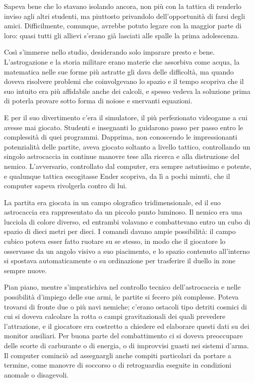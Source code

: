 {Sapeva bene che lo stavano isolando ancora, non più con la tattica di
	renderlo inviso agli altri studenti, ma piuttosto privandolo
	dell'opportunità di farsi degli amici. Difficilmente, comunque, avrebbe
	potuto legare con la maggior parte di loro: quasi tutti gli allievi
	s'erano già lasciati alle spalle la prima adolescenza.}

{Così s'immerse nello studio, desiderando solo imparare presto e bene.
	L'astrogazione e la storia militare erano materie che assorbiva come
	acqua, la matematica nelle sue forme più astratte gli dava delle
	difficoltà, ma quando doveva risolvere problemi che coinvolgevano lo
	spazio e il tempo scopriva che il suo intuito era più affidabile anche
	dei calcoli, e spesso vedeva la soluzione prima di poterla provare sotto
	forma di noiose e snervanti equazioni.}

{E per il suo divertimento c'era il simulatore, il più perfezionato
	videogame a cui avesse mai giocato. Studenti e insegnanti lo guidarono
	passo per passo entro le complessità di quei programmi. Dapprima, non
	conoscendo le impressionanti potenzialità delle partite, aveva giocato
	soltanto a livello tattico, controllando un singolo astrocaccia in
	continue manovre tese alla ricerca e alla distruzione del nemico.
	L'avversario, controllato dal computer, era sempre astutissimo e
	potente, e qualunque tattica escogitasse Ender scopriva, da lì a pochi
	minuti, che il computer sapeva rivolgerla contro di lui.}

{La partita era giocata in un campo olografico tridimensionale, ed il
	suo astrocaccia era rappresentato da un piccolo punto luminoso. Il
	nemico era una lucciola di colore diverso, ed entrambi volavano e
	combattevano entro un cubo di spazio di dieci metri per dieci. I comandi
	davano ampie possibilità: il campo cubico poteva esser fatto ruotare su
	se stesso, in modo che il giocatore lo osservasse da un angolo visivo a
	suo piacimento, e lo spazio contenuto all'interno si spostava
	automaticamente o su ordinazione per trasferire il duello in zone sempre
	nuove.}

{Pian piano, mentre s'impratichiva nel controllo tecnico
	dell'astrocaccia e nelle possibilità d'impiego delle sue armi, le
	partite si fecero più complesse. Poteva trovarsi di fronte due o più
	navi nemiche; c'erano ostacoli tipo detriti cosmici di cui si doveva
	calcolare la rotta o campi gravitazionali dei quali prevedere
	l'attrazione, e il giocatore era costretto a chiedere ed elaborare
	questi dati su dei monitor ausiliari. Per buona parte del combattimento
	ci si doveva preoccupare delle scorte di carburante o di energia, o di
	improvvisi guasti nei sistemi d'arma. Il computer cominciò ad
	assegnargli anche compiti particolari da portare a termine, come manovre
	di soccorso o di retroguardia eseguite in condizioni anomale o
	disagevoli.}

